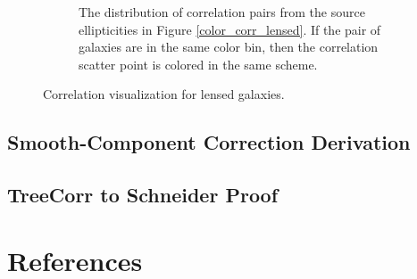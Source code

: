 \documentclass[%
 reprint,
 amsmath,amssymb,
 aps,nofootinbib
]{revtex4-1}
\begin{document}
\begin{figure}
\begin{subfigure}{0.44\textwidth}
        \captionsetup{justification=raggedright,singlelinecheck=false}
        \caption{The distribution of correlation pairs from the source ellipticities in Figure \ref{color_corr_lensed}. If the pair of galaxies are in the same color bin, then the correlation scatter point is colored in the same scheme.}
        \label{corr_dist_lensed}
    \end{subfigure}
    \vspace{-.05in}
    \caption{Correlation visualization for lensed galaxies.}
    \label{colored_corr_lensed}
\end{figure}

\subsection*{Smooth-Component Correction Derivation}

\subsection*{TreeCorr to Schneider Proof}

\section{References}
\vspace{-.2825in}


\end{document}
